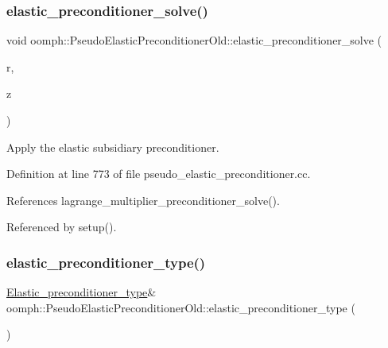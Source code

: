 \subsubsection{\texorpdfstring{elastic\+\_\+preconditioner\+\_\+solve()}{elastic\_preconditioner\_solve()}}
{\footnotesize\ttfamily void oomph\+::\+Pseudo\+Elastic\+Preconditioner\+Old\+::elastic\+\_\+preconditioner\+\_\+solve (\begin{DoxyParamCaption}\item[{const Double\+Vector \&}]{r,  }\item[{Double\+Vector \&}]{z }\end{DoxyParamCaption})\hspace{0.3cm}{\ttfamily [private]}}



Apply the elastic subsidiary preconditioner. 



Definition at line 773 of file pseudo\+\_\+elastic\+\_\+preconditioner.\+cc.



References lagrange\+\_\+multiplier\+\_\+preconditioner\+\_\+solve().



Referenced by setup().

\mbox{\label{classoomph_1_1PseudoElasticPreconditionerOld_a9edf6f556251ea6ca1b15baf3f6b0425}} 
\subsubsection{\texorpdfstring{elastic\+\_\+preconditioner\+\_\+type()}{elastic\_preconditioner\_type()}}
{\footnotesize\ttfamily \hyperlink{classoomph_1_1PseudoElasticPreconditionerOld_a6748360e3e2fbd4766d837a520dadfd0}{Elastic\+\_\+preconditioner\+\_\+type}\& oomph\+::\+Pseudo\+Elastic\+Preconditioner\+Old\+::elastic\+\_\+preconditioner\+\_\+type (\begin{DoxyParamCaption}{ }\end{DoxyParamCaption})\hspace{0.3cm}{\ttfamily [inline]}}




